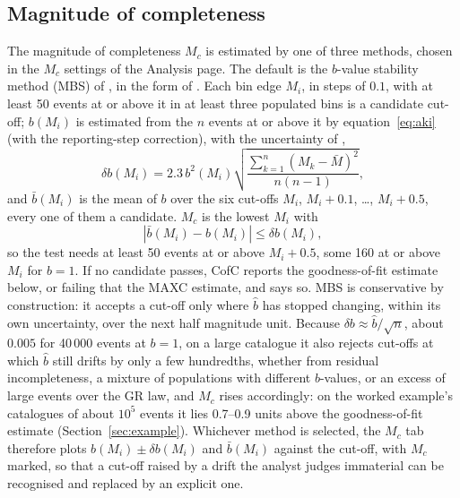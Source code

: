 \documentclass[12pt]{article}
\begin{document}
\subsection{Magnitude of completeness}
\label{sec:mc}

The magnitude of completeness $M_c$ is estimated by one of three methods, chosen
in the $M_c$ settings of the Analysis page.  The default is the $b$-value
stability method (MBS) of \citet{caogao2002}, in the form of
\citet{woessner2005}.  Each bin edge $M_i$, in steps of $0.1$, with at least 50
events at or above it in at least three populated bins is a candidate cut-off;
$b(M_i)$ is estimated from the $n$ events at or above it by
equation~\eqref{eq:aki} (with the reporting-step correction), with the
uncertainty of \citet{shibolt1982},
\begin{equation}
  \delta b(M_i) = 2.3\,b^2(M_i)
    \sqrt{\frac{\sum_{k=1}^{n} (M_k - \bar{M})^2}{n(n-1)}},
  \label{eq:shibolt}
\end{equation}
and $\bar{b}(M_i)$ is the mean of $b$ over the six cut-offs $M_i$, $M_i + 0.1$,
\ldots, $M_i + 0.5$, every one of them a candidate.  $M_c$ is the lowest $M_i$ with
\begin{equation}
  \left|\bar{b}(M_i) - b(M_i)\right| \leq \delta b(M_i),
  \label{eq:mbs}
\end{equation}
so the test needs at least 50 events at or above $M_i + 0.5$, some 160 at or
above $M_i$ for $b = 1$.  If no candidate passes, CofC reports the
goodness-of-fit estimate below, or failing that the MAXC estimate, and says so.
MBS is conservative by construction: it accepts a cut-off only where $\hat{b}$
has stopped changing, within its own uncertainty, over the next half magnitude
unit.  Because $\delta b \approx \hat{b}/\sqrt{n}$, about $0.005$ for 40\,000
events at $b = 1$, on a large catalogue it also rejects cut-offs at which
$\hat{b}$ still drifts by only a few hundredths, whether from residual
incompleteness, a mixture of populations with different $b$-values, or an
excess of large events over the GR law, and $M_c$ rises accordingly: on the
worked example's catalogues of about $10^5$ events it lies 0.7--0.9 units above
the goodness-of-fit estimate (Section~\ref{sec:example}).  Whichever method is
selected, the $M_c$ tab therefore plots $b(M_i) \pm \delta b(M_i)$ and
$\bar{b}(M_i)$ against the cut-off, with $M_c$ marked, so that a cut-off raised by
a drift the analyst judges immaterial can be recognised and replaced by an
explicit one.
\end{document}
